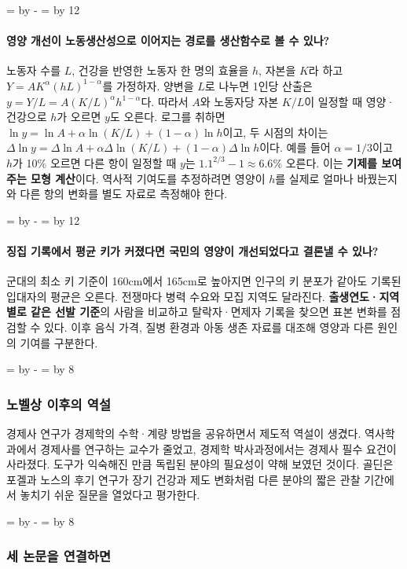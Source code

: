 \documentclass[10pt,a4paper]{article}
\newcommand{\ReserveQuestionSpace}{%
  \par\begingroup
  \dimen0=\pagegoal \advance\dimen0 by -\pagetotal
  \dimen2=\baselineskip \multiply\dimen2 by 12
  \ifdim\dimen0<\dimen2 \newpage\fi
  \endgroup}
\newcommand{\ReserveReadingSectionSpace}{%
  \par\begingroup
  \dimen0=\pagegoal \advance\dimen0 by -\pagetotal
  \dimen2=\baselineskip \multiply\dimen2 by 8
  \ifdim\dimen0<\dimen2 \newpage\fi
  \endgroup}
\begin{document}
\ReserveQuestionSpace
\paragraph{영양 개선이 노동생산성으로 이어지는 경로를 생산함수로 볼 수 있나?}
노동자 수를 $L$, 건강을 반영한 노동자 한 명의 효율을 $h$, 자본을 $K$라 하고 $Y=A K^\alpha(hL)^{1-\alpha}$를 가정하자. 양변을 $L$로 나누면 1인당 산출은 $y=Y/L=A(K/L)^\alpha h^{1-\alpha}$다. 따라서 $A$와 노동자당 자본 $K/L$이 일정할 때 영양·건강으로 $h$가 오르면 $y$도 오른다. 로그를 취하면 $\ln y=\ln A+\alpha\ln(K/L)+(1-\alpha)\ln h$이고, 두 시점의 차이는 $\Delta\ln y=\Delta\ln A+\alpha\Delta\ln(K/L)+(1-\alpha)\Delta\ln h$이다. 예를 들어 $\alpha=1/3$이고 $h$가 10\% 오르면 다른 항이 일정할 때 $y$는 $1.1^{2/3}-1\approx6.6\%$ 오른다. 이는 \textbf{기제를 보여 주는 모형 계산}이다. 역사적 기여도를 추정하려면 영양이 $h$를 실제로 얼마나 바꿨는지와 다른 항의 변화를 별도 자료로 측정해야 한다.\par

\ReserveQuestionSpace
\paragraph{징집 기록에서 평균 키가 커졌다면 국민의 영양이 개선되었다고 결론낼 수 있나?}
군대의 최소 키 기준이 160cm에서 165cm로 높아지면 인구의 키 분포가 같아도 기록된 입대자의 평균은 오른다. 전쟁마다 병력 수요와 모집 지역도 달라진다. \textbf{출생연도·지역별로 같은 선발 기준}의 사람을 비교하고 탈락자·면제자 기록을 찾으면 표본 변화를 점검할 수 있다. 이후 음식 가격, 질병 환경과 아동 생존 자료를 대조해 영양과 다른 원인의 기여를 구분한다.\par

\ReserveReadingSectionSpace
\subsubsection*{노벨상 이후의 역설}

경제사 연구가 경제학의 수학·계량 방법을 공유하면서 제도적 역설이 생겼다. 역사학과에서 경제사를 연구하는 교수가 줄었고, 경제학 박사과정에서는 경제사 필수 요건이 사라졌다. 도구가 익숙해진 만큼 독립된 분야의 필요성이 약해 보였던 것이다. 골딘은 포겔과 노스의 후기 연구가 장기 건강과 제도 변화처럼 다른 분야의 짧은 관찰 기간에서 놓치기 쉬운 질문을 열었다고 평가한다.\par

\ReserveReadingSectionSpace
\subsubsection*{세 논문을 연결하면}
\end{document}
